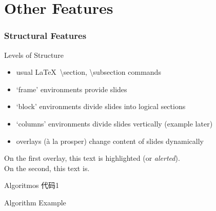 \documentclass[UTF8, aspectratio=169 , 10pt，punct=kaiming]{beamer} %
\begin{document}
\section{Other Features}

\begin{frame}
  \frametitle{Structural Features}
  \begin{block}{Levels of Structure}
    \begin{itemize}
      \item usual \LaTeX\ \textbackslash{}section, \textbackslash{}subsection commands
      \item `frame' environments provide slides
      \item `block' environments divide slides into logical sections
      \item `columns' environments divide slides vertically (example later)
      \item overlays (\`a la prosper) change content of slides dynamically
    \end{itemize}
  \end{block}
  
  \begin{example}
    On the first overlay, \alert<1>{this text} is highlighted (or \emph{alerted}).\\ On the second, \alert<2>{this text} is.
  \end{example}
\end{frame}

\begin{frame}{Algoritmos 代码1}
  \begin{algorithm}[H]
      \SetAlgoLined
      \LinesNumbered
       \caption{Algorithm Example}
  \end{algorithm}
\end{frame}
\end{document}
